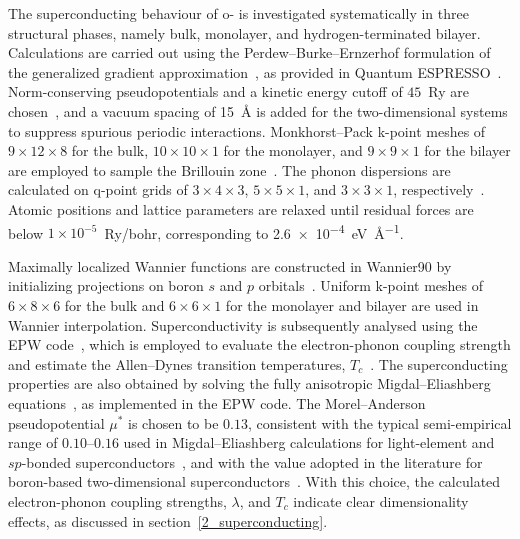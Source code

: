 The superconducting behaviour of o- is investigated systematically in three structural phases,
namely bulk, monolayer, and hydrogen-terminated bilayer.
Calculations are carried out using the Perdew--Burke--Ernzerhof formulation of the generalized gradient approximation~\cite{perdew1996generalized},
as provided in Quantum ESPRESSO~\cite{giannozzi2009quantum}.
Norm-conserving pseudopotentials and a kinetic energy cutoff of $45$~Ry are chosen~\cite{hamann2013optimized},
and a vacuum spacing of \qty{15}{\angstrom} is added for the two-dimensional systems to suppress spurious periodic interactions.
Monkhorst--Pack k-point meshes of $9 \times 12 \times 8$ for the bulk,
$10 \times 10 \times 1$ for the monolayer,
and $9 \times 9 \times 1$ for the bilayer are employed to sample the Brillouin zone~\cite{methfessel1989high}.
The phonon dispersions are calculated on q-point grids of $3 \times 4 \times 3$,
$5 \times 5 \times 1$, and $3 \times 3 \times 1$, respectively~\cite{baroni2001phonons}.
Atomic positions and lattice parameters are relaxed until residual forces are below $1\times10^{-5}$~Ry/bohr,
corresponding to \qty{2.6e-4}{\electronvolt\per\angstrom}.

Maximally localized Wannier functions are constructed in Wannier90 by initializing projections on boron $s$ and $p$ orbitals~\cite{pizzi2020wannier90}.
Uniform k-point meshes of $6 \times 8 \times 6$ for the bulk and $6 \times 6 \times 1$ for the monolayer and bilayer are used in Wannier interpolation.
Superconductivity is subsequently analysed using the EPW code~\cite{giannozzi2009quantum,giannozzi2020quantum,giannozzi2017advanced,ponce2016epw},
which is employed to evaluate the electron-phonon coupling strength and estimate the Allen--Dynes transition temperatures, $T_c$~\cite{margine2013anisotropic}.
The superconducting properties are also obtained by solving the fully anisotropic Migdal--Eliashberg equations~\cite{bardeen1955electron,giustino2017electron,margine2013anisotropic},
as implemented in the EPW code.
The Morel--Anderson pseudopotential $\mu^{*}$ is chosen to be $0.13$,
consistent with the typical semi-empirical range of $0.10$--$0.16$ used in Migdal--Eliashberg calculations for light-element and $sp$-bonded superconductors~\cite{allen-dynes},
and with the value adopted in the literature for boron-based two-dimensional superconductors~\cite{zhao2019two}.
With this choice,
the calculated electron-phonon coupling strengths, $\lambda$, and $T_c$ indicate clear dimensionality effects,
as discussed in section~\ref{2_superconducting}.

